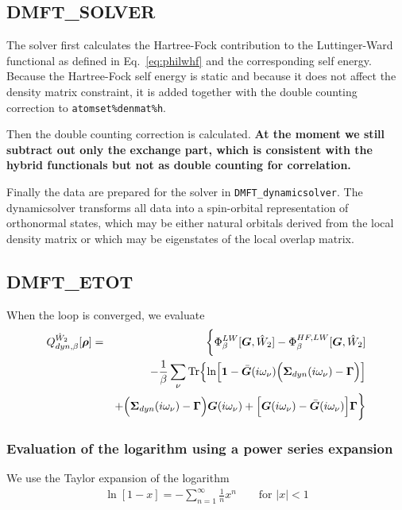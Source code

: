 \documentclass[11pt,a4paper]{report}
\begin{document}
\subsection{DMFT\_SOLVER}
The solver first calculates the Hartree-Fock contribution to the
Luttinger-Ward functional as defined in Eq.~\ref{eq:philwhf} and the
corresponding self energy. Because the Hartree-Fock self energy is
static and because it does not affect the density matrix constraint,
it is added together with the double counting correction to
\verb|atomset%denmat%h|.


Then the double counting correction is calculated. \textbf{At the
  moment we still subtract out only the exchange part, which is
  consistent with the hybrid functionals but not as double counting
  for correlation.}

Finally the data are prepared for the solver in
\verb|DMFT_dynamicsolver|. The dynamicsolver transforms all data into
a spin-orbital representation of orthonormal states, which may be
either natural orbitals derived from the local density matrix or which
may be eigenstates of the local overlap matrix.

\subsection{DMFT\_ETOT}
When the loop is converged,  we evaluate 
\begin{eqnarray}
Q^{\hat{W}_2}_{dyn,\beta}[\bm{\rho}]
&=&
\biggl\lbrace
\Phi^{LW}_\beta[\bm{G},\hat{W}_2]-\Phi^{HF,LW}_\beta[\bm{G},\hat{W}_2]
\nonumber\\
&&-\frac{1}{\beta}\sum_\nu\mathrm{Tr}\Bigl\lbrace
\ln\Bigl[
\bm{1}-
\bar{\bm{G}}(i\omega_\nu)
\Bigl(\bm{\Sigma}_{dyn}(i\omega_\nu)-\bm{\Gamma}\Bigr)
\Bigr]
\nonumber\\&&
+\Bigl(\bm{\Sigma}_{dyn}(i\omega_\nu)-\bm{\Gamma}\Bigr)\bm{G}(i\omega_\nu)
+
\Bigl[\bm{G}(i\omega_\nu)-\bar{\bm{G}}(i\omega_\nu)\Bigr]
\bm{\Gamma}
\biggr\rbrace
\nonumber\\
\label{eq:dmf1greenenergy}
\end{eqnarray}

\subsubsection{Evaluation of the logarithm using a power series expansion}
We use the Taylor expansion of the logarithm
\begin{eqnarray}
\ln[1-x]=-\sum_{n=1}^\infty \frac{1}{n}x^n \qquad\text{for $|x|<1$}
\end{eqnarray}
\end{document}
